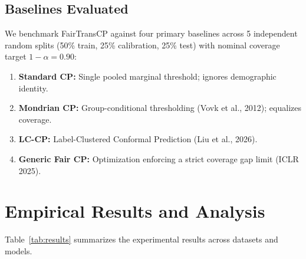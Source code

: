 \documentclass[11pt,a4paper]{article}
\begin{document}
\subsection{Baselines Evaluated}
We benchmark FairTransCP against four primary baselines across 5 independent random splits (50\% train, 25\% calibration, 25\% test) with nominal coverage target $1 - \alpha = 0.90$:
\begin{enumerate}[leftmargin=1.5em, itemsep=2pt]
    \item \textbf{Standard CP:} Single pooled marginal threshold; ignores demographic identity.
    \item \textbf{Mondrian CP:} Group-conditional thresholding (Vovk et al., 2012); equalizes coverage.
    \item \textbf{LC-CP:} Label-Clustered Conformal Prediction (Liu et al., 2026).
    \item \textbf{Generic Fair CP:} Optimization enforcing a strict coverage gap limit (ICLR 2025).
\end{enumerate}

\section{Empirical Results and Analysis}

Table~\ref{tab:results} summarizes the experimental results across datasets and models.
\end{document}
